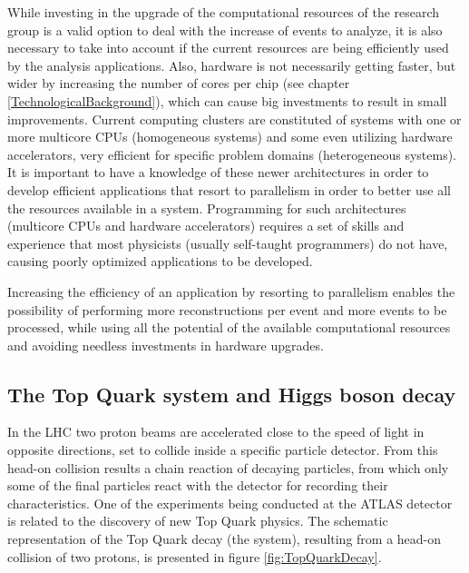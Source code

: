 While investing in the upgrade of the computational resources of the research group is a valid option to deal with the increase of events to analyze, it is also necessary to take into account if the current resources are being efficiently used by the analysis applications. Also, hardware is not necessarily getting faster, but wider by increasing the number of cores per chip (see chapter \ref{TechnologicalBackground}), which can cause big investments to result in small improvements. Current computing clusters are constituted of systems with one or more multicore CPUs (homogeneous systems) and some even utilizing hardware accelerators, very efficient for specific problem domains (heterogeneous systems). It is important to have a knowledge of these newer architectures in order to develop efficient applications that resort to parallelism in order to better use all the resources available in a system. Programming for such architectures (multicore CPUs and hardware accelerators) requires a set of skills and experience that most physicists (usually self-taught programmers) do not have, causing poorly optimized applications to be developed.

Increasing the efficiency of an application by resorting to parallelism enables the possibility of performing more reconstructions per event and more events to be processed, while using all the potential of the available computational resources and avoiding needless investments in hardware upgrades.

\subsection{The Top Quark system and Higgs boson decay}
\label{TopQuarkSystem}

In the LHC two proton beams are accelerated close to the speed of light in opposite directions, set to collide inside a specific particle detector. From this head-on collision results a chain reaction of decaying particles, from which only some of the final particles react with the detector for recording their characteristics. One of the experiments being conducted at the ATLAS detector is related to the discovery of new Top Quark physics. The schematic representation of the Top Quark decay (the \ttbar system), resulting from a head-on collision of two protons, is presented in figure \ref{fig:TopQuarkDecay}.

